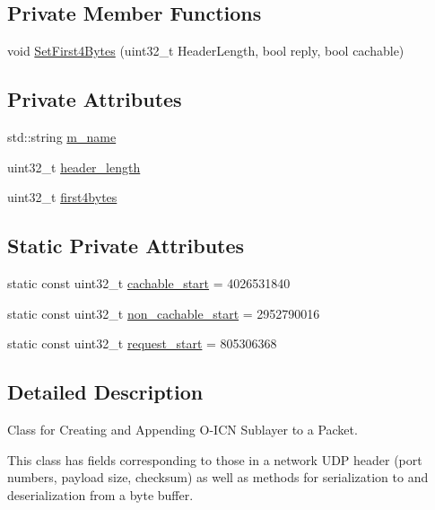 \subsection*{Private Member Functions}
\begin{DoxyCompactItemize}
\item 
void \hyperlink{classns3_1_1OicnHeader_a6d775da4ae5ddd0b71f478422add3d68}{Set\-First4\-Bytes} (uint32\-\_\-t Header\-Length, bool reply, bool cachable)
\end{DoxyCompactItemize}
\subsection*{Private Attributes}
\begin{DoxyCompactItemize}
\item 
std\-::string \hyperlink{classns3_1_1OicnHeader_a4ec6866334efab8674e2b0d96837a4ae}{m\-\_\-name}
\item 
uint32\-\_\-t \hyperlink{classns3_1_1OicnHeader_a4992cefc6d31c27977363db61c068111}{header\-\_\-length}
\item 
uint32\-\_\-t \hyperlink{classns3_1_1OicnHeader_ac4f7599f027c10e4433efdcb8541ef38}{first4bytes}
\end{DoxyCompactItemize}
\subsection*{Static Private Attributes}
\begin{DoxyCompactItemize}
\item 
static const uint32\-\_\-t \hyperlink{classns3_1_1OicnHeader_af3b93655facbb38e13c98576c4454ec2}{cachable\-\_\-start} = 4026531840
\item 
static const uint32\-\_\-t \hyperlink{classns3_1_1OicnHeader_a822030e2b6549b78e31c440f4fe1f458}{non\-\_\-cachable\-\_\-start} = 2952790016
\item 
static const uint32\-\_\-t \hyperlink{classns3_1_1OicnHeader_a9fa69f9639455b3ed94cbb616e2809c0}{request\-\_\-start} = 805306368
\end{DoxyCompactItemize}


\subsection{Detailed Description}
Class for Creating and Appending O-\/\-I\-C\-N Sublayer to a Packet. 

This class has fields corresponding to those in a network U\-D\-P header (port numbers, payload size, checksum) as well as methods for serialization to and deserialization from a byte buffer. 

